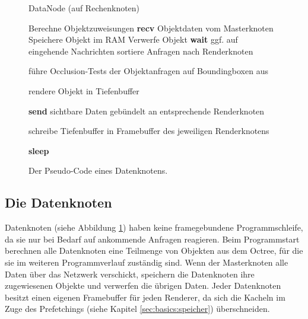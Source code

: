 \begin{figure}[tt]
\centering
 \begin{minipage}[t]{12.5cm}
\begin{algorithm}[H]
  \caption{DataNode (auf Rechenknoten)\label{alg:impl:datanode}} 
    \begin{algorithmic} [1]
      \STATE Berechne Objektzuweisungen
      \STATE \textbf{recv} Objektdaten vom Masterknoten
	\STATE Speichere Objekt im RAM
      \ELSE
	\STATE Verwerfe Objekt
      \ENDIF
	\STATE \textbf{wait} ggf. auf eingehende Nachrichten
	  \STATE sortiere Anfragen nach Renderknoten
	    \STATE \begin{flushleft}führe Occlusion-Tests der Objektanfragen auf Boundingboxen aus\end{flushleft}
	  \ENDFOR
	    \STATE rendere Objekt in Tiefenbuffer
 	  \ENDFOR
	  \STATE \begin{flushleft}\textbf{send} sichtbare Daten gebündelt an entsprechende Renderknoten\end{flushleft}
	  \STATE \begin{flushleft}schreibe Tiefenbuffer in Framebuffer des jeweiligen Renderknotens\end{flushleft}
	\ELSE \STATE\textbf{sleep}
	\ENDIF
      \ENDWHILE
    \end{algorithmic}
\end{algorithm}
 \end{minipage}
\caption{\label{fig:impl:datanode}Der Pseudo-Code eines Datenknotens.}
\end{figure}

\subsection{Die Datenknoten}
\label{sec:impl:daten}
Datenknoten (siehe Abbildung \ref{fig:impl:datanode}) haben keine framegebundene Programmschleife, da sie nur bei Bedarf auf ankommende Anfragen reagieren. Beim Programmstart berechnen alle Datenknoten eine Teilmenge von Objekten aus dem Octree, für die sie im weiteren Programmverlauf zuständig sind. Wenn der Masterknoten alle Daten über das Netzwerk verschickt, speichern die Datenknoten ihre zugewiesenen Objekte und verwerfen die übrigen Daten. Jeder Datenknoten besitzt einen eigenen Framebuffer für jeden Renderer, da sich die Kacheln im Zuge des Prefetchings (siehe Kapitel \ref{sec:basics:speicher}) überschneiden. 

